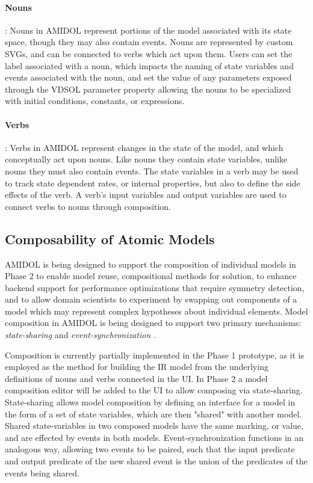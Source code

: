 \documentclass[11pt]{article}
\newcommand{\amidol}{\textsc{AMIDOL}}
\begin{document}
\paragraph{Nouns}: Nouns in \amidol{} represent portions of the model associated with its state space, though they may also contain events.  Nouns are represented by custom SVGs, and can be connected to verbs which act upon them.  Users can set the label associated with a noun, which impacts the naming of state variables and events associated with the noun, and set the value of any parameters exposed through the VDSOL parameter property allowing the nouns to be specialized with initial conditions, constants, or expressions.

\paragraph{Verbs}: Verbs in \amidol{} represent changes in the state of the model, and which conceptually act upon nouns.  Like nouns they contain state variables, unlike nouns they must also contain events.  The state variables in a verb may be used to track state dependent rates, or internal properties, but also to define the side effects of the verb.  A verb's input variables and output variables are used to connect verbs to nouns through composition.

\subsection{Composability of Atomic Models}

\amidol{} is being designed to support the composition of individual models in Phase 2 to enable model reuse, compositional methods for solution, to enhance backend support for performance optimizations that require symmetry detection, and to allow domain scientists to experiment by swapping out components of a model which may represent complex hypotheses about individual elements.  Model composition in \amidol{} is being designed to support two primary mechanisms: \emph{state-sharing} \cite{sanders1992dependability,sanders1988construction} and \emph{event-synchronization} \cite{lampka2002symbolic}.

Composition is currently partially implemented in the Phase 1 prototype, as it is employed as the method for building the IR model from the underlying definitions of nouns and verbs connected in the UI.  In Phase 2 a model composition editor will be added to the UI to allow composing via state-sharing. State-sharing allows model composition by defining an interface for a model in the form of a set of state variables, which are then "shared" with another model.  Shared state-variables in two composed models have the same marking, or value, and are effected by events in both models.  Event-synchronization functions in an analogous way, allowing two events to be paired, such that the input predicate and output predicate of the new shared event is the union of the predicates of the events being shared.
\end{document}

